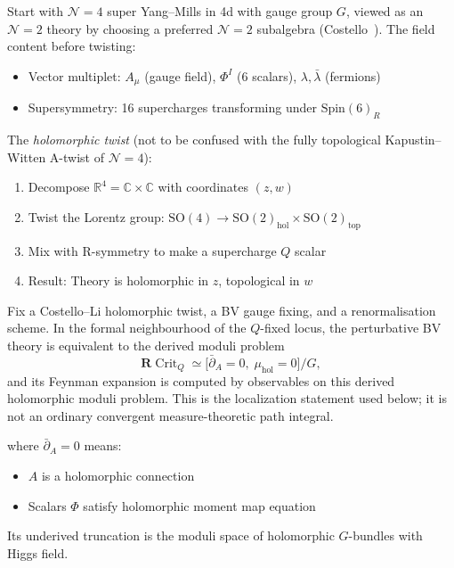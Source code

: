 \begin{definition}[Holomorphic twist of 4d \texorpdfstring{$\mathcal{N}=4$}{N=4} SYM]
Start with $\mathcal{N}=4$ super Yang--Mills in 4d with gauge group $G$, viewed as an $\mathcal{N}=2$ theory by choosing a preferred $\mathcal{N}=2$ subalgebra (Costello~\cite{costello-renormalization}). The field content before twisting:
\begin{itemize}
\item Vector multiplet: $A_\mu$ (gauge field), $\Phi^I$ (6 scalars), $\lambda,
\bar{\lambda}$ (fermions)
\item Supersymmetry: 16 supercharges transforming under $\text{Spin}(6)_R$
\end{itemize}

The \emph{holomorphic twist} (not to be confused with the fully topological Kapustin--Witten A-twist of $\mathcal{N}=4$):
\begin{enumerate}
\item Decompose $\mathbb{R}^4 = \mathbb{C} \times \mathbb{C}$ with coordinates
$(z, w)$
\item Twist the Lorentz group: $\text{SO}(4) \to \text{SO}(2)_{\text{hol}} \times
\text{SO}(2)_{\text{top}}$
\item Mix with R-symmetry to make a supercharge $Q$ scalar
\item Result: Theory is holomorphic in $z$, topological in $w$
\end{enumerate}
\end{definition}

\begin{theorem}\label{thm:ht-localization}
Fix a Costello--Li holomorphic twist, a BV gauge fixing, and a
renormalisation scheme.  In the formal neighbourhood of the \(Q\)-fixed
locus, the perturbative BV theory is equivalent to the derived moduli
problem
\[
\mathbf{R}\!\operatorname{Crit}_Q
\simeq
\bigl[\bar{\partial}_A=0,\;\mu_{\mathrm{hol}}=0\bigr]/G,
\]
and its Feynman expansion is computed by observables on this derived
holomorphic moduli problem.  This is the localization statement used
below; it is not an ordinary convergent measure-theoretic path integral.

where $\bar{\partial}_A = 0$ means:
\begin{itemize}
\item $A$ is a holomorphic connection
\item Scalars $\Phi$ satisfy holomorphic moment map equation
\end{itemize}

Its underived truncation is the moduli space of holomorphic
\(G\)-bundles with Higgs field.
\end{theorem}

